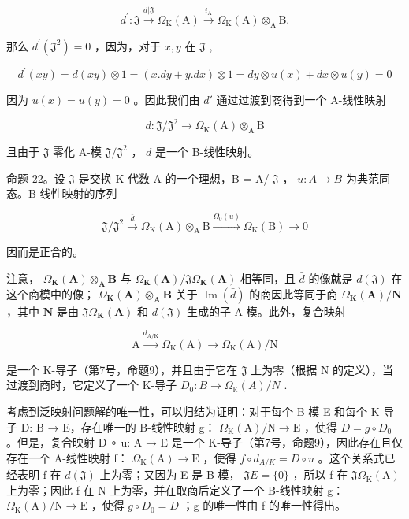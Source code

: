 \[
d ^ {\prime}: \mathfrak {J} \xrightarrow {d | \mathfrak {J}} \Omega_ {\mathrm{K}} (\mathrm{A}) \xrightarrow {i _ {\mathrm{A}}} \Omega_ {\mathrm{K}} (\mathrm{A}) \otimes_ {\mathrm{A}} \mathrm{B}.
\]

那么 \(d^{\prime}(\mathfrak{J}^{2}) = 0\) ，因为，对于 \(x, y\) 在 \(\mathfrak{J}\) ,

\[
d ^ {\prime} (x y) = d (x y) \otimes 1 = (x. d y + y. d x) \otimes 1 = d y \otimes u (x) + d x \otimes u (y) = 0
\]

因为 \(u(x) = u(y) = 0\) 。因此我们由 \(d'\) 通过过渡到商得到一个 A-线性映射

\[
\bar {d} \colon \mathfrak {J} / \mathfrak {J} ^ {2} \rightarrow \Omega_ {\mathrm{K}} (\mathrm{A}) \otimes_ {\mathrm{A}} \mathrm{B}
\]

且由于 \(\mathfrak{J}\) 零化 A-模 \(\mathfrak{J} / \mathfrak{J}^2\) ， \(\bar{d}\) 是一个 B-线性映射。

命题 22。设 \(\mathfrak{J}\) 是交换 K-代数 A 的一个理想，B = A/ \(\mathfrak{J}\) ， \(u:A\to B\) 为典范同态。B-线性映射的序列

\[
\mathfrak {J} / \mathfrak {J} ^ {2} \xrightarrow {\overline {{d}}} \Omega_ {\mathrm{K}} (\mathrm{A}) \otimes_ {\mathrm{A}} \mathrm{B} \xrightarrow {\Omega_ {0} (u)} \Omega_ {\mathrm{K}} (\mathrm{B}) \to 0\tag{46}
\]

因而是正合的。

注意， \(\Omega_{\mathbf{K}}(\mathbf{A}) \otimes_{\mathbf{A}} \mathbf{B}\) 与 \(\Omega_{\mathbf{K}}(\mathbf{A}) / \mathfrak{J} \Omega_{\mathbf{K}}(\mathbf{A})\) 相等同，且 \(\bar{d}\) 的像就是 \(d(\mathfrak{J})\) 在这个商模中的像； \(\Omega_{\mathbf{K}}(\mathbf{A}) \otimes_{\mathbf{A}} \mathbf{B}\) 关于 \(\operatorname{Im}(\bar{d})\) 的商因此等同于商 \(\Omega_{\mathbf{K}}(\mathbf{A}) / \mathbf{N}\) ，其中 \(\mathbf{N}\) 是由 \(\mathfrak{J} \Omega_{\mathbf{K}}(\mathbf{A})\) 和 \(d(\mathfrak{J})\) 生成的子 A-模。此外，复合映射

\[
\mathrm{A} \xrightarrow {d _ {\mathrm{A} / \mathrm{K}}} \Omega_ {\mathrm{K}} (\mathrm{A}) \longrightarrow \Omega_ {\mathrm{K}} (\mathrm{A}) / \mathrm{N}
\]

是一个 K-导子（第7号，命题9），并且由于它在 \(\mathfrak{J}\) 上为零（根据 N 的定义），当过渡到商时，它定义了一个 K-导子 \(D_0:B\to \Omega_{\mathbb{K}}(A) / N\) .

考虑到泛映射问题解的唯一性，可以归结为证明：对于每个 B-模 E 和每个 K-导子 D: B → E，存在唯一的 B-线性映射 g： \(\Omega_{\mathrm{K}}(\mathrm{A})/\mathrm{N} \rightarrow \mathrm{E}\) ，使得 \(D = g \circ D_{0}\) 。但是，复合映射 D ∘ u: A → E 是一个 K-导子（第7号，命题9），因此存在且仅存在一个 A-线性映射 f： \(\Omega_{\mathrm{K}}(\mathrm{A}) \rightarrow \mathrm{E}\) ，使得 \(f \circ d_{A/K} = D \circ u\) 。这个关系式已经表明 f 在 \(d(\mathfrak{J})\) 上为零；又因为 E 是 B-模， \(\mathfrak{J} E = \{0\}\) ，所以 f 在 \(\mathfrak{J} \Omega_{\mathrm{K}}(\mathrm{A})\) 上为零；因此 f 在 N 上为零，并在取商后定义了一个 B-线性映射 g： \(\Omega_{\mathrm{K}}(\mathrm{A})/\mathrm{N} \rightarrow \mathrm{E}\) ，使得 \(g \circ D_{0} = D\) ；g 的唯一性由 f 的唯一性得出。

